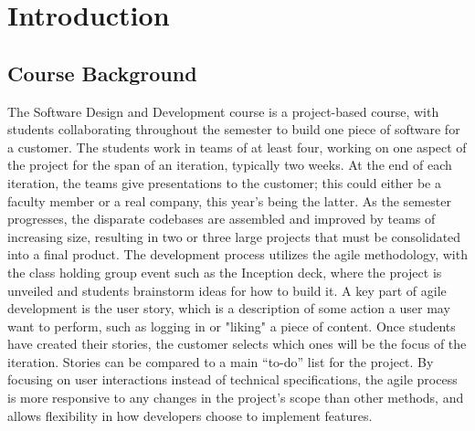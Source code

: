 \documentclass[12pt]{article}
\begin{document}
\newpage

\setcounter{page}{1}


\section{Introduction}\label{sec:introduction}
\subsection{Course Background}\label{sec:course_background}
The Software Design and Development course is a project-based course, with students collaborating throughout the semester to build one piece of software for a customer. 
The students work in teams of at least four, working on one aspect of the project for the span of an iteration, typically two weeks. 
At the end of each iteration, the teams give presentations to the customer; this could either be a faculty member or a real company, this year's being the latter. 
As the semester progresses, the disparate codebases are assembled and improved by teams of increasing size, resulting in two or three large projects that must be consolidated into a final product. 
The development process utilizes the agile methodology, with the class holding group event such as the Inception deck, where the project is unveiled and students brainstorm ideas for how to build it. 
A key part of agile development is the user story, which is a description of some action a user may want to perform, such as logging in or "liking" a piece of content. 
Once students have created their stories, the customer selects which ones will be the focus of the iteration. Stories can be compared to a main ``to-do'' list for the project. 
By focusing on user interactions instead of technical specifications, the agile process is more responsive to any changes in the project's scope than other methods, and allows flexibility in how developers choose to implement features.
\end{document}
